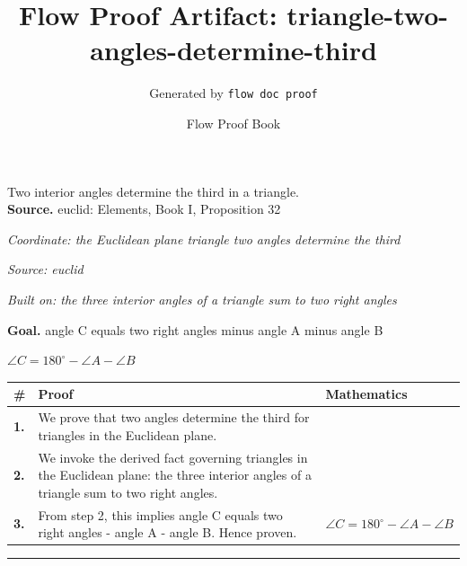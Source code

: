\documentclass[11pt]{article}
\title{Flow Proof Artifact: triangle-two-angles-determine-third}
\author{Generated by \texttt{flow doc proof}}
\date{Flow Proof Book}
\theoremstyle{definition}
\begin{document}
\maketitle
Two interior angles determine the third in a triangle.\\[0.5em]
\textbf{Source.} euclid: Elements, Book I, Proposition 32\\[0.5em]
\bigskip
{}\par
\smallskip\noindent\textit{Coordinate: the Euclidean plane \cdot triangle \cdot two angles determine the third}\par
\smallskip\noindent\textit{Source: euclid}\par
\smallskip\noindent\textit{Built on: the three interior angles of a triangle sum to two right angles}\par
\medskip
\noindent\textbf{Goal.} angle C equals two right angles minus angle A minus angle B\par
\noindent$\displaystyle \angle C = 180^\circ - \angle A - \angle B$\par
\medskip
\noindent
\begin{tabular}{@{} >{\raggedright\arraybackslash}p{} >{\raggedright\arraybackslash}p{} >{\raggedleft\arraybackslash}p{} @{}}
\textbf{\#} & \textbf{Proof} & \textbf{Mathematics} \\
\midrule
\textbf{1.} & We prove that two angles determine the third for triangles in the Euclidean plane. & \\[0.45em]
\textbf{2.} & We invoke the derived fact governing triangles in the Euclidean plane: the three interior angles of a triangle sum to two right angles. & \\[0.45em]
\textbf{3.} & From step 2, this implies angle C equals two right angles - angle A - angle B. Hence proven. & $\displaystyle \angle C = 180^\circ - \angle A - \angle B$ \\[0.45em]
\bottomrule
\end{tabular}
\label{thm:Geometry-triangle-two_angles_determine_the_third}
\par\medskip\hrule
\end{document}

